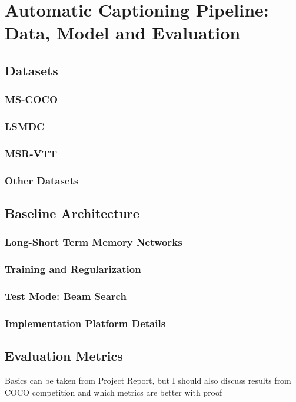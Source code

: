 \chapter{Automatic Captioning Pipeline: Data, Model and Evaluation}
\label{chapter:baseline}
\section{Datasets}
\subsection{MS-COCO}
\subsection{LSMDC}
\subsection{MSR-VTT}
\subsection{Other Datasets}
\section{Baseline Architecture}
\subsection{Long-Short Term Memory Networks}
\subsection{Training and Regularization}
\subsection{Test Mode: Beam Search}
\subsection{Implementation Platform Details}
\section{Evaluation Metrics}
Basics can be taken from Project Report, but I should also
discuss results from COCO competition and which metrics are better with proof
